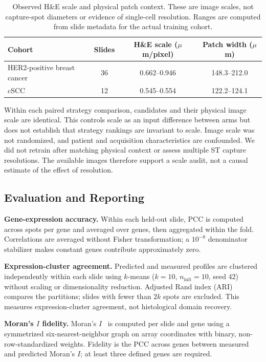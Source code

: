 \documentclass[]{spie}
\begin{document}
\begin{table}[htbp]
\centering
\caption{Observed H\&E scale and physical patch context. These are image scales, not capture-spot diameters or evidence of single-cell resolution. Ranges are computed from slide metadata for the actual training cohort.}
\label{tab:resolution}
\begin{tabular}{lccc}
\hline
Cohort & Slides & H\&E scale ($\mu$m/pixel) & Patch width ($\mu$m) \\
\hline
HER2-positive breast cancer & 36 & 0.662--0.946 & 148.3--212.0 \\
cSCC & 12 & 0.545--0.554 & 122.2--124.1 \\
\hline
\end{tabular}
\end{table}

Within each paired strategy comparison, candidates and their physical image scale are identical. This controls scale as an input difference between arms but does not establish that strategy rankings are invariant to scale. Image scale was not randomized, and patient and acquisition characteristics are confounded. We did not retrain after matching physical context or assess multiple ST capture resolutions. The available images therefore support a scale audit, not a causal estimate of the effect of resolution.

\subsection{Evaluation and Reporting}
\label{sec:evaluation}

\noindent\textbf{Gene-expression accuracy.}
Within each held-out slide, PCC is computed across spots per gene and averaged over genes, then aggregated within the fold. Correlations are averaged without Fisher transformation; a $10^{-8}$ denominator stabilizer makes constant genes contribute approximately zero.

\noindent\textbf{Expression-cluster agreement.}
Predicted and measured profiles are clustered independently within each slide using $k$-means ($k=10$, $n_{\mathrm{init}}=10$, seed 42) without scaling or dimensionality reduction. Adjusted Rand index (ARI)~\cite{hubert1985comparing} compares the partitions; slides with fewer than $2k$ spots are excluded. This measures expression-cluster agreement, not histological domain recovery.

\noindent\textbf{Moran's $I$ fidelity.}
Moran's $I$~\cite{moran1950notes} is computed per slide and gene using a symmetrized six-nearest-neighbor graph on array coordinates with binary, non-row-standardized weights. Fidelity is the PCC across genes between measured and predicted Moran's $I$; at least three defined genes are required.
\end{document}
